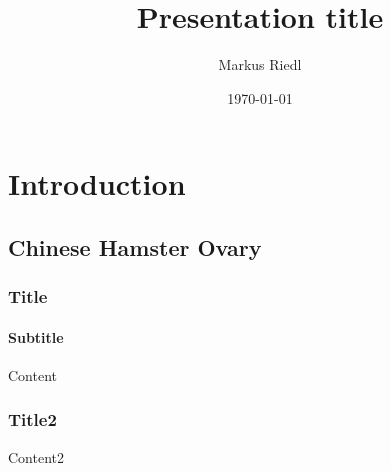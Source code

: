 \documentclass[aspectratio=169]{beamer}
\title{Presentation title}
\author{Markus Riedl}
\date{\today} %
\begin{document}
\begin{frame}[plain]
\titlepage
\end{frame}

\section{Introduction}

\subsection{Chinese Hamster Ovary}

\begin{frame}
    \frametitle{Title}
    \framesubtitle{Subtitle}

    Content
\end{frame}

\begin{frame}
    \frametitle{Title2}

    Content2
\end{frame}
\end{document}
